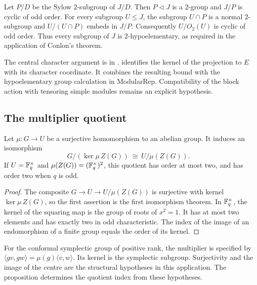 Let $P/D$ be the Sylow $2$-subgroup of $J/D$. Then $P\lhd J$ is a
$2$-group and $J/P$ is cyclic of odd order. For every subgroup $U\leq J$,
the subgroup $U\cap P$ is a normal $2$-subgroup and
$U/(U\cap P)$ embeds in $J/P$. Consequently $U/O_2(U)$ is cyclic of
odd order. Thus every subgroup of $J$ is $2$-hypoelementary, as required
in the application of Conlon's theorem.

\begin{implementation}
The central character argument is in
.
 identifies the kernel of the
projection to $E$ with its character coordinate. It combines the resulting
bound with the hypoelementary group calculation in ModularRep.
Compatibility of the block action with tensoring
simple modules remains an explicit hypothesis.
\end{implementation}

\newpage
\begin{samepage}
\section{The multiplier quotient}

\begin{proposition}
Let $\mu\colon G\longrightarrow U$ be a surjective homomorphism to an
abelian group. It induces an isomorphism
\[
 G/(\ker\mu\,Z(G))\ \cong\ U/\mu(Z(G)).
\]
If $U=\mathbb F_q^\times$ and $\mu(Z(G))=(\mathbb F_q^\times)^2$, this quotient has
order at most two, and has order two when $q$ is odd.
\end{proposition}
\end{samepage}

\begin{proof}
The composite $G\longrightarrow U\longrightarrow U/\mu(Z(G))$ is
surjective with kernel $\ker\mu\,Z(G)$, so the first assertion is the
first isomorphism theorem. In $\mathbb F_q^\times$, the kernel of the squaring
map is the group of roots of $x^2=1$. It has at most two elements and
has exactly two in odd characteristic. The index of the image of an
endomorphism of a finite group equals the order of its kernel.
\end{proof}

For the conformal symplectic group of positive rank, the multiplier is specified by
$\langle gv,gw\rangle=\mu(g)\langle v,w\rangle$. Its kernel is the
symplectic subgroup. Surjectivity and the image of the centre are the
structural hypotheses in this application. The proposition determines the quotient index
from these hypotheses.

